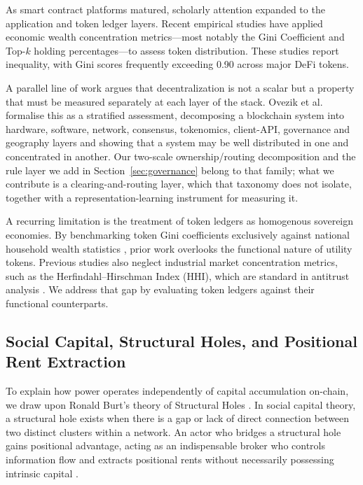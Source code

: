 \documentclass[final,5p,times]{elsarticle}
\begin{document}
As smart contract platforms matured, scholarly attention expanded to the application and token ledger layers. Recent empirical studies \cite{gudgeon2020defi, campajola2023evolution, zarir2021developing} have applied economic wealth concentration metrics—most notably the Gini Coefficient and Top-$k$ holding percentages—to assess token distribution. These studies report inequality, with Gini scores frequently exceeding 0.90 across major DeFi tokens.

A parallel line of work argues that decentralization is not a scalar but a property that must be measured separately at each layer of the stack. Ovezik et al.\ \cite{ovezik2022sok} formalise this as a stratified assessment, decomposing a blockchain system into hardware, software, network, consensus, tokenomics, client-API, governance and geography layers and showing that a system may be well distributed in one and concentrated in another. Our two-scale ownership/routing decomposition and the rule layer we add in Section~\ref{sec:governance} belong to that family; what we contribute is a clearing-and-routing layer, which that taxonomy does not isolate, together with a representation-learning instrument for measuring it.

A recurring limitation is the treatment of token ledgers as homogenous sovereign economies. By benchmarking token Gini coefficients exclusively against national household wealth statistics \cite{ubs2024wealth}, prior work overlooks the functional nature of utility tokens. Previous studies also neglect industrial market concentration metrics, such as the Herfindahl--Hirschman Index (HHI), which are standard in antitrust analysis \cite{doj2010horizontal}. We address that gap by evaluating token ledgers against their functional counterparts.

\subsection{Social Capital, Structural Holes, and Positional Rent Extraction}
To explain how power operates independently of capital accumulation on-chain, we draw upon Ronald Burt's theory of Structural Holes \cite{burt1992structural, burt2004structural}. In social capital theory, a structural hole exists when there is a gap or lack of direct connection between two distinct clusters within a network. An actor who bridges a structural hole gains positional advantage, acting as an indispensable broker who controls information flow and extracts positional rents without necessarily possessing intrinsic capital \cite{granovetter1973strength, burt2004structural}.
\end{document}
